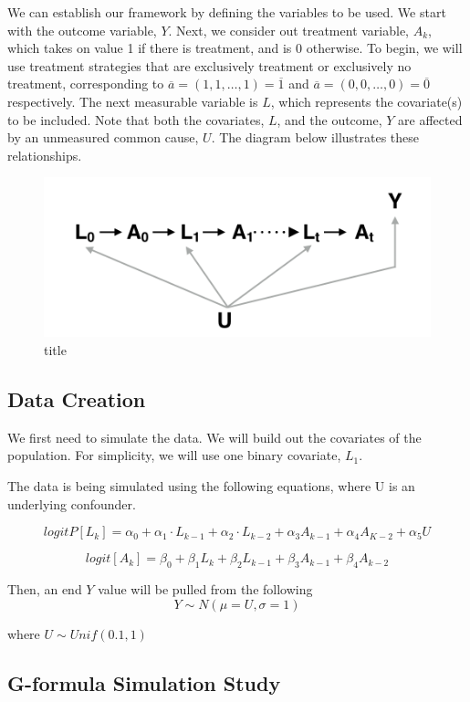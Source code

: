 We can establish our framework by defining the variables to be used. We
start with the outcome variable, \(Y\). Next, we consider out treatment
variable, \(A_k\), which takes on value 1 if there is treatment, and is
0 otherwise. To begin, we will use treatment strategies that are
exclusively treatment or exclusively no treatment, corresponding to
\(\overline{a} = (1,1,\dots,1) = \overline{1}\) and
\(\overline{a} = (0,0,\dots,0) = \overline{0}\) respectively. The next
measurable variable is \(L\), which represents the covariate(s) to be
included. Note that both the covariates, \(L\), and the outcome, \(Y\)
are affected by an unmeasured common cause, \(U\). The diagram below
illustrates these relationships.

\begin{figure}
\centering
\includegraphics{image4.png}
\caption{title}
\end{figure}

\subsection{Data Creation}\label{data-creation}

We first need to simulate the data. We will build out the covariates of
the population. For simplicity, we will use one binary covariate,
\(L_1\).

The data is being simulated using the following equations, where U is an
underlying confounder.

\[logitP[L_k] = \alpha_0 + \alpha_1 \cdot L_{k-1} + \alpha_2 \cdot L_{k-2} + \alpha_3 A_{k-1} + \alpha_4 A_{K-2} + \alpha_5 U\]

\[ logit[A_k] = \beta_0 + \beta_1 L_{k} + \beta_2 L_{k-1} + \beta_3 A_{k-1} + \beta_4 A_{k-2} \]

Then, an end \(Y\) value will be pulled from the following
\[ Y \sim N(\mu = U, \sigma = 1) \]

where \(U \sim Unif(0.1, 1)\)

\subsection{G-formula Simulation
Study}\label{g-formula-simulation-study}

